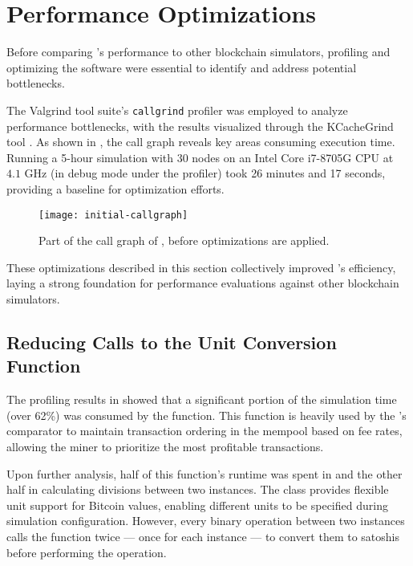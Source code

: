 \section{Performance Optimizations}\label{sec:optimizations}

Before comparing \iblock{}'s performance to other blockchain simulators,
profiling and optimizing the software were essential to identify and address
potential bottlenecks.

The Valgrind tool suite's \texttt{callgrind} profiler was employed to analyze
performance bottlenecks, with the results visualized through the KCacheGrind
tool \cites{callgrind, valgrind}. As shown in , the call
graph reveals key areas consuming execution time. Running a 5-hour simulation
with 30 nodes on an Intel Core i7-8705G CPU at \(4.1\) GHz (in debug mode under
the profiler) took 26 minutes and 17 seconds, providing a baseline for
optimization efforts.

\begin{figure}[tbhp]
	\centering
	\texttt{[image: initial-callgraph]}
	\caption{Part of the call graph of \iblock{}, before optimizations are
	applied.}\label{fig:callgrind}
\end{figure}

These optimizations described in this section collectively improved \iblock{}'s
efficiency, laying a strong foundation for performance evaluations against
other blockchain simulators.

\subsection{Reducing Calls to the Unit Conversion
Function}\label{subsec:reducing-convert-calls}

The profiling results in  showed that a significant
portion of the simulation time (over 62\%) was consumed by the
 function. This function is heavily used by the
's comparator to maintain transaction ordering in the
mempool based on fee rates, allowing the miner to prioritize the most
profitable transactions.

Upon further analysis, half of this function's runtime was spent in
 and the other half in calculating divisions between two
 instances. The  class provides flexible unit
support for Bitcoin values, enabling different units to be specified during
simulation configuration. However, every binary operation between two
 instances calls the  function twice --- once
for each instance --- to convert them to satoshis before performing the
operation.


